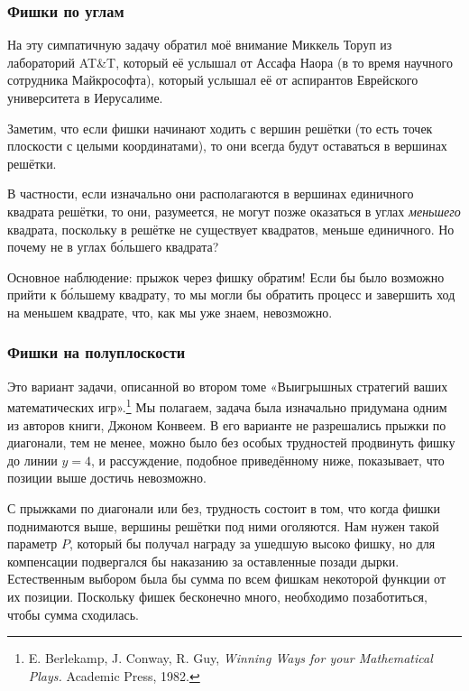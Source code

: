 \subsubsection*{Фишки по углам}%

На эту симпатичную задачу обратил моё внимание Миккель Торуп из лабораторий AT\&T, %
который её услышал от Ассафа Наора %
(в то время научного сотрудника Майкрософта), который услышал её от аспирантов Еврейского университета в Иерусалиме.

\medskip

Заметим, что если фишки начинают ходить с вершин решётки (то есть точек плоскости с целыми координатами), то они всегда будут оставаться в вершинах решётки.

В частности, если изначально они располагаются в вершинах единичного квадрата решётки, то они, разумеется, не могут позже оказаться в углах \emph{меньшего} квадрата, поскольку в решётке не существует квадратов, меньше единичного.
Но почему не в углах б\'{о}льшего квадрата?

Основное наблюдение: прыжок через фишку обратим!
Если бы было возможно прийти к б\'{о}льшему квадрату, то мы могли бы обратить процесс и завершить ход на меньшем квадрате, что, как мы уже знаем, невозможно.
\heart

\subsubsection*{Фишки на полуплоскости}%

Это вариант задачи, описанной во втором томе «Выигрышных стратегий ваших математических игр».\footnote{E. Berlekamp, J. Conway, R. Guy,
\emph{Winning Ways for your Mathematical Plays.} Academic Press, 1982.}
Мы полагаем, задача была изначально придумана одним из авторов книги, Джоном Конвеем.
В его варианте не разрешались прыжки по диагонали, тем не менее, можно было без особых трудностей продвинуть фишку до линии $y = 4$, и рассуждение, подобное приведённому ниже, показывает, что позиции выше достичь невозможно.

\medskip

С прыжками по диагонали или без, трудность состоит в том, что когда фишки поднимаются выше, вершины решётки под ними оголяются.
Нам нужен такой параметр $P$, который бы получал награду за ушедшую высоко фишку, но для компенсации подвергался бы наказанию за оставленные позади дырки.
Естественным выбором была бы сумма по всем фишкам некоторой функции от их позиции.
Поскольку фишек бесконечно много, необходимо позаботиться, чтобы сумма сходилась.

